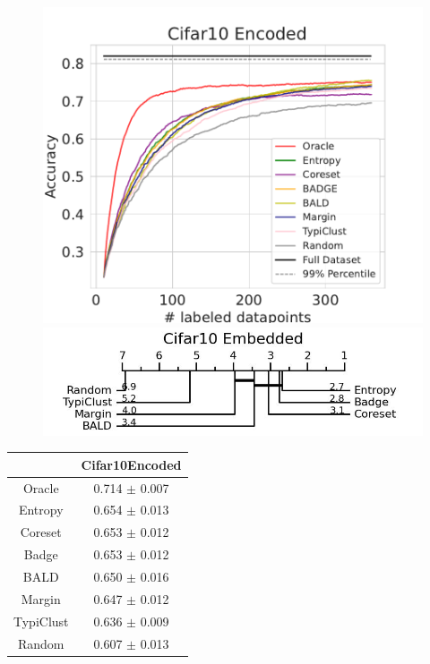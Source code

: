 \documentclass[]{article}
\begin{document}
\begin{minipage}{0.65\linewidth}
\begin{figure}[H]
    \centering
    \includegraphics[width=\linewidth]{img/eval_cifar10_enc} \\ [2mm]
    \includegraphics[width=\linewidth]{img/micro_cifar10_enc.jpg} 
\end{figure}
\end{minipage}
\begin{minipage}{0.29\linewidth}
\begin{tabular}{c|c}
&Cifar10Encoded\\
\hline
Oracle&0.714 $\pm$ 0.007\\
Entropy&0.654 $\pm$ 0.013\\
Coreset&0.653 $\pm$ 0.012\\
Badge&0.653 $\pm$ 0.012\\
BALD&0.650 $\pm$ 0.016\\
Margin&0.647 $\pm$ 0.012\\
TypiClust&0.636 $\pm$ 0.009\\
Random&0.607 $\pm$ 0.013\\
\end{tabular}
\end{minipage}
\end{document}
